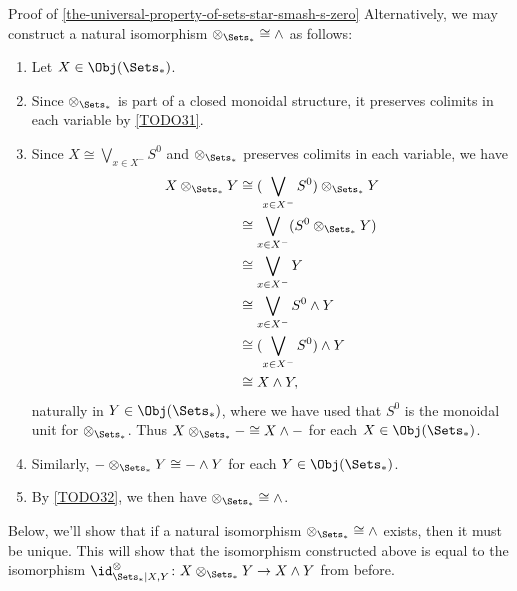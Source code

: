 \begin{Proof}{Proof of \cref{the-universal-property-of-sets-star-smash-s-zero}}
    Alternatively, we may construct a natural isomorphism $\mathord{\otimes_{\Sets_{*}}}\cong\mathord{\wedge}$ as follows:
    \begin{enumerate}
        \item\label{proof-of-the-universal-property-of-sets-times-pt-constructing-an-isomorphism-otimes-times-1}Let $X\in\Obj(\Sets_{*})$.
        \item\label{proof-of-the-universal-property-of-sets-times-pt-constructing-an-isomorphism-otimes-times-2}Since $\otimes_{\Sets_{*}}$ is part of a closed monoidal structure, it preserves colimits in each variable by \cref{TODO31}.
        \item\label{proof-of-the-universal-property-of-sets-times-pt-constructing-an-isomorphism-otimes-times-3}Since $X\cong\bigvee_{x\in X^{-}}S^{0}$ and $\otimes_{\Sets_{*}}$ preserves colimits in each variable, we have
            \begin{align*}
                X\otimes_{\Sets_{*}}Y &\cong (\bigvee_{x\in X^{-}}S^{0})\otimes_{\Sets_{*}}Y\\
                                      &\cong \bigvee_{x\in X^{-}}(S^{0}\otimes_{\Sets_{*}}Y)\\
                                      &\cong \bigvee_{x\in X^{-}}Y\\
                                      &\cong \bigvee_{x\in X^{-}}S^{0}\wedge Y\\
                                      &\cong (\bigvee_{x\in X^{-}}S^{0})\wedge Y\\
                                      &\cong X\wedge Y,
            \end{align*}
            naturally in $Y\in\Obj(\Sets_{*})$, where we have used that $S^{0}$ is the monoidal unit for $\otimes_{\Sets_{*}}$. Thus $X\otimes_{\Sets_{*}}-\cong X\wedge-$ for each $X\in\Obj(\Sets_{*})$.
        \item\label{proof-of-the-universal-property-of-sets-times-pt-constructing-an-isomorphism-otimes-times-4}Similarly, $-\otimes_{\Sets_{*}}Y\cong-\wedge Y$ for each $Y\in\Obj(\Sets_{*})$.
        \item\label{proof-of-the-universal-property-of-sets-times-pt-constructing-an-isomorphism-otimes-times-5}By \cref{TODO32}, we then have $\mathord{\otimes_{\Sets_{*}}}\cong\mathord{\wedge}$.
    \end{enumerate}
    Below, we'll show that if a natural isomorphism $\mathord{\otimes_{\Sets_{*}}}\cong\mathord{\wedge}$ exists, then it must be unique. This will show that the isomorphism constructed above is equal to the isomorphism $\id^{\otimes}_{\Sets_{*}|X,Y}\colon X\otimes_{\Sets_{*}}Y\to X\wedge Y$ from before.


\end{Proof}
